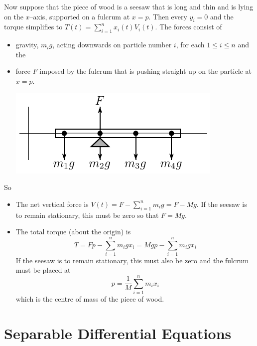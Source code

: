 Now suppose that the piece of wood is a seesaw that is long and thin and
is lying on the $x$--axis, supported on a fulcrum at $x=p$.
Then every $y_i=0$ and the torque simplifies to
$T(t)=\sum_{i=1}^n x_i(t)V_i(t)$. The forces consist of
\begin{itemize}
\item
gravity, $m_ig$, acting downwards on particle number $i$, for each
$1\le i\le n$ and the%
\item
force $F$ imposed by the fulcrum that is pushing straight up on the particle
at $x=p$.
\begin{efig}
\begin{center}
    \includegraphics{seesaw2}
\end{center}
\end{efig}
\end{itemize}
So
\begin{itemize}
\item
The net vertical force is $V(t)=F-\sum\limits_{i=1}^n m_ig
=F-Mg$. If the seesaw is to remain stationary, this must be zero so that
$F=Mg$.
\item
The total torque (about the origin) is
\begin{equation*}
T=Fp-\sum_{i=1}^n m_ig x_i
=Mgp-\sum_{i=1}^n m_ig x_i
\end{equation*}
If the seesaw is to remain stationary, this must also be zero and the fulcrum
must be placed at
\begin{equation}\label{eq:TRQfulcrum}
p=\frac{1}{M}\sum_{i=1}^n m_i x_i
\end{equation}
which is the centre of mass of the piece of wood.
\end{itemize}




\section{Separable Differential Equations}\label{sec sep de}


